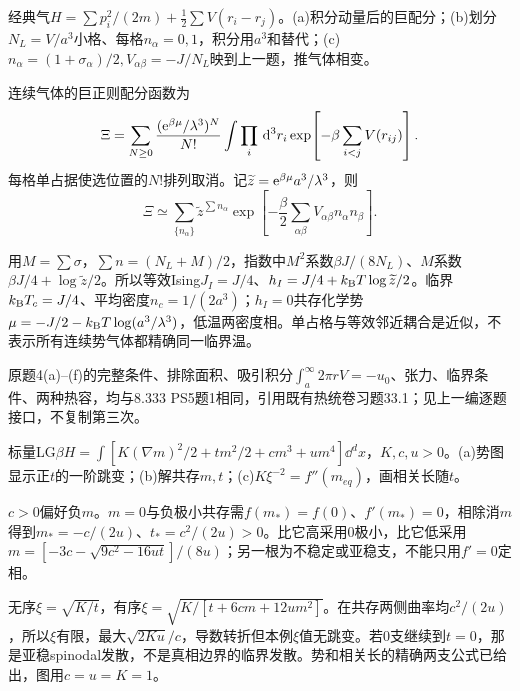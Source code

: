 \begin{exercise}[原题3(a)--(c)]\label{r:334-1-3}
经典气$H=\sum p_i^2/(2m)+\tfrac12\sum V(r_i-r_j)$。(a)积分动量后的巨配分；(b)划分$N_L=V/a^3$小格、每格$n_\alpha=0,1$，积分用$a^3$和替代；(c)$n_\alpha=(1+\sigma_\alpha)/2,V_{\alpha\beta}=-J/N_L$映到上一题，推气体相变。
\end{exercise}
\begin{solution}
连续气体的巨正则配分函数为
\begin{equation}
\Xi=\sum_{N\ge0}\frac{(\mathrm e^{\beta\mu}/\lambda^3)^N}{N!}
\int\prod_i\,\mathrm d^3r_i\exp\!\left[-\beta\sum_{i<j}V(r_{ij})\right].
\end{equation}
每格单占据使选位置的$N!$排列取消。记$\widetilde z=\mathrm e^{\beta\mu}a^3/\lambda^3$，则
\begin{equation}
\Xi\simeq\sum_{\{n_\alpha\}}\widetilde z^{\sum n_\alpha}
\exp\!\left[-\frac\beta2\sum_{\alpha\beta}V_{\alpha\beta}n_\alpha n_\beta\right].
\end{equation}

用$M=\sum\sigma$，$\sum n=(N_L+M)/2$，指数中$M^2$系数$\beta J/(8N_L)$、$M$系数$\beta J/4+\log\widetilde z/2$。所以等效Ising$J_I=J/4$、$h_I=J/4+k_{\mathrm B} T\log\widetilde z/2$。临界$k_{\mathrm B} T_c=J/4$、平均密度$n_c=1/(2a^3)$；$h_I=0$共存化学势$\mu=-J/2-k_{\mathrm B} T\log(a^3/\lambda^3)$，低温两密度相。单占格与等效邻近耦合是近似，不表示所有连续势气体都精确同一临界温。
\end{solution}
原题4(a)--(f)的完整条件、排除面积、吸引积分$\int_a^\infty2\pi rV=-u_0$、张力、临界条件、两种热容，均与8.333 PS5题1相同，引用既有热统卷习题33.1；见上一编逐题接口，不复制第三次。
\begin{exercise}[原题5(a)--(c)]\label{r:334-1-5}
标量LG$\beta H=\int[K(\nabla m)^2/2+tm^2/2+cm^3+um^4]\dd^dx$，$K,c,u>0$。(a)势图显示正$t$的一阶跳变；(b)解共存$m,t$；(c)$K\xi^{-2}=f''(m_{eq})$，画相关长随$t$。
\end{exercise}
\begin{solution}
$c>0$偏好负$m$。$m=0$与负极小共存需$f(m_*)=f(0)$、$f'(m_*)=0$，相除消$m$得到$m_*=-c/(2u)$、$t_*=c^2/(2u)>0$。比它高采用0极小，比它低采用$m=[-3c-\sqrt{9c^2-16ut}]/(8u)$；另一根为不稳定或亚稳支，不能只用$f'=0$定相。

无序$\xi=\sqrt{K/t}$，有序$\xi=\sqrt{K/[t+6cm+12um^2]}$。在共存两侧曲率均$c^2/(2u)$，所以$\xi$有限，最大$\sqrt{2Ku}/c$，导数转折但本例$\xi$值无跳变。若$0$支继续到$t=0$，那是亚稳spinodal发散，不是真相边界的临界发散。势和相关长的精确两支公式已给出，图用$c=u=K=1$。
\begin{center}\end{center}
\end{solution}
